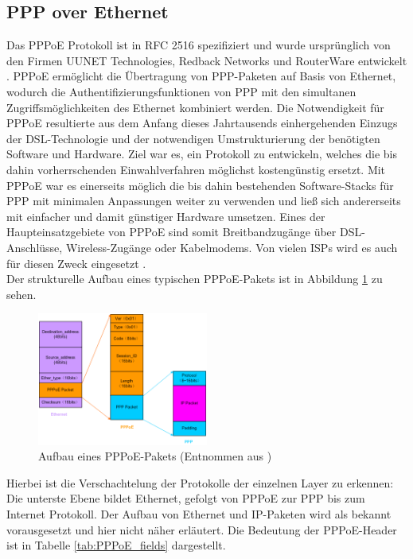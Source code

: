\documentclass[journal,11pt]{IEEEtran}
\begin{document}
\subsection{PPP over Ethernet}
Das PPPoE Protokoll ist in RFC 2516 spezifiziert und wurde ursprünglich
von den Firmen UUNET Technologies, Redback Networks und RouterWare entwickelt \cite{RFC2516}.
PPPoE ermöglicht die Übertragung von PPP-Paketen auf Basis von Ethernet, wodurch
die Authentifizierungsfunktionen von PPP mit den
simultanen Zugriffsmöglichkeiten des Ethernet kombiniert werden.
Die Notwendigkeit für PPPoE resultierte aus dem Anfang dieses Jahrtausends
einhergehenden Einzugs der DSL-Technologie und der notwendigen Umstrukturierung
der benötigten Software und Hardware. Ziel war es, ein Protokoll zu entwickeln,
welches die bis dahin vorherrschenden Einwahlverfahren möglichst kostengünstig
ersetzt. Mit PPPoE war es einerseits möglich die bis dahin bestehenden Software-Stacks für PPP
mit minimalen Anpassungen weiter zu verwenden und ließ sich andererseits mit einfacher
und damit günstiger Hardware umsetzen\cite{dslapp}.
Eines der Haupteinsatzgebiete von PPPoE sind somit Breitbandzugänge über DSL-Anschlüsse,
Wireless-Zugänge oder Kabelmodems. Von vielen ISPs wird es auch f\"ur diesen Zweck eingesetzt \cite[p.88]{cisconut}.\\
%
Der strukturelle Aufbau eines typischen PPPoE-Pakets ist in Abbildung \ref{fig:PPPoE_Bild} zu sehen.
\begin{figure}[h!]
 \centering
  \includegraphics[width=0.5\textwidth]{img/pppoe_aufbau.jpg}
 \caption{Aufbau eines PPPoE-Pakets (Entnommen aus \cite{pppoe_h3c})}
 \label{fig:PPPoE_Bild}
\end{figure}
Hierbei ist die Verschachtelung der Protokolle der einzelnen Layer zu erkennen: Die unterste
Ebene bildet Ethernet, gefolgt von PPPoE zur PPP bis zum Internet Protokoll.
Der Aufbau von Ethernet und IP-Paketen wird als bekannt vorausgesetzt und hier nicht näher erläutert.
Die Bedeutung der PPPoE-Header ist in Tabelle \ref{tab:PPPoE_fields} dargestellt.
\end{document}
